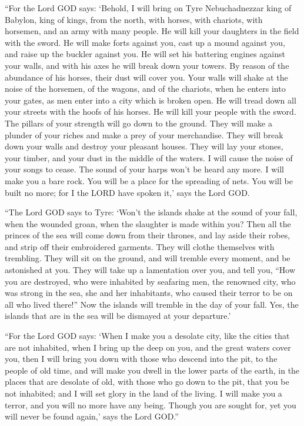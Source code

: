  ``For the Lord GOD says: `Behold, I will bring on Tyre
Nebuchadnezzar king of Babylon, king of kings, from the north, with
horses, with chariots, with horsemen, and an army with many people.
 He will kill your daughters in the field with the sword. He
will make forts against you, cast up a mound against you, and raise up
the buckler against you.  He will set his battering engines
against your walls, and with his axes he will break down your towers.
 By reason of the abundance of his horses, their dust will
cover you. Your walls will shake at the noise of the horsemen, of the
wagons, and of the chariots, when he enters into your gates, as men
enter into a city which is broken open.  He will tread down
all your streets with the hoofs of his horses. He will kill your people
with the sword. The pillars of your strength will go down to the ground.
 They will make a plunder of your riches and make a prey of
your merchandise. They will break down your walls and destroy your
pleasant houses. They will lay your stones, your timber, and your dust
in the middle of the waters.  I will cause the noise of
your songs to cease. The sound of your harps won't be heard any more.
 I will make you a bare rock. You will be a place for the
spreading of nets. You will be built no more; for I the LORD have spoken
it,' says the Lord GOD.

 ``The Lord GOD says to Tyre: `Won't the islands shake at
the sound of your fall, when the wounded groan, when the slaughter is
made within you?  Then all the princes of the sea will come
down from their thrones, and lay aside their robes, and strip off their
embroidered garments. They will clothe themselves with trembling. They
will sit on the ground, and will tremble every moment, and be astonished
at you.  They will take up a lamentation over you, and tell
you, ``How you are destroyed, who were inhabited by seafaring men, the
renowned city, who was strong in the sea, she and her inhabitants, who
caused their terror to be on all who lived there!''  Now
the islands will tremble in the day of your fall. Yes, the islands that
are in the sea will be dismayed at your departure.'

 ``For the Lord GOD says: `When I make you a desolate city,
like the cities that are not inhabited, when I bring up the deep on you,
and the great waters cover you,  then I will bring you down
with those who descend into the pit, to the people of old time, and will
make you dwell in the lower parts of the earth, in the places that are
desolate of old, with those who go down to the pit, that you be not
inhabited; and I will set glory in the land of the living. 
I will make you a terror, and you will no more have any being. Though
you are sought for, yet you will never be found again,' says the Lord
GOD.''

